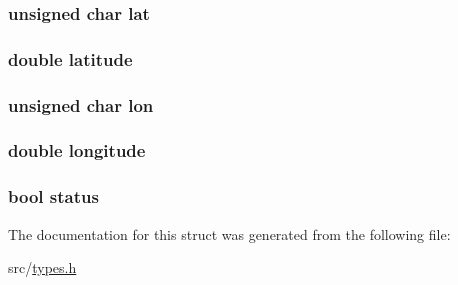 \subsubsection[{\texorpdfstring{lat}{lat}}]{\setlength{\rightskip}{0pt plus 5cm}unsigned char lat}\hypertarget{structgll_a6a2e4ad53afd61fcd716002fc2965220}{}\label{structgll_a6a2e4ad53afd61fcd716002fc2965220}
\subsubsection[{\texorpdfstring{latitude}{latitude}}]{\setlength{\rightskip}{0pt plus 5cm}double latitude}\hypertarget{structgll_a76714bdbc5c536fa77dfb14533ff82a9}{}\label{structgll_a76714bdbc5c536fa77dfb14533ff82a9}
\subsubsection[{\texorpdfstring{lon}{lon}}]{\setlength{\rightskip}{0pt plus 5cm}unsigned char lon}\hypertarget{structgll_a7e55b80071251dcef4239e60122980a4}{}\label{structgll_a7e55b80071251dcef4239e60122980a4}
\subsubsection[{\texorpdfstring{longitude}{longitude}}]{\setlength{\rightskip}{0pt plus 5cm}double longitude}\hypertarget{structgll_ac155e35fdeebafc89723a51520fb9fe6}{}\label{structgll_ac155e35fdeebafc89723a51520fb9fe6}
\subsubsection[{\texorpdfstring{status}{status}}]{\setlength{\rightskip}{0pt plus 5cm}bool status}\hypertarget{structgll_ad1f0bff7112206922c9d5a87adad6f2b}{}\label{structgll_ad1f0bff7112206922c9d5a87adad6f2b}


The documentation for this struct was generated from the following file\+:\begin{DoxyCompactItemize}
\item 
src/\hyperlink{types_8h}{types.\+h}\end{DoxyCompactItemize}
